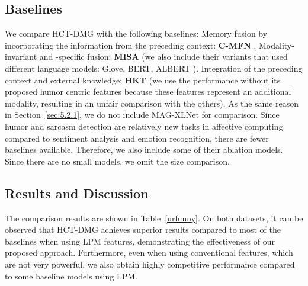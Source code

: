 \documentclass[11pt,a4paper]{article}
\begin{document}
\subsection{Baselines}
We compare HCT-DMG with the following baselines: Memory fusion by incorporating the information from the preceding context: \textbf{C-MFN} \citep{hasan2019ur}. Modality-invariant and -specific fusion: \textbf{MISA} \citep{hazarika2020misa} (we also include their variants that used different language models: Glove, BERT, ALBERT \cite{lan2019albert}). Integration of the preceding context and external knowledge: \textbf{HKT} \citep{hasan2021humor} (we use the performance without its proposed humor centric features because these features represent an additional modality, resulting in an unfair comparison with the others). As the same reason in Section~\ref{sec:5.2.1}, we do not include MAG-XLNet for comparison. Since humor and sarcasm detection are relatively new tasks in affective computing compared to sentiment analysis and emotion recognition, there are fewer baselines available. Therefore, we also include some of their ablation models. Since there are no small models, we omit the size comparison.

\subsection{Results and Discussion}

The comparison results are shown in Table~\ref{urfunny}. On both datasets, it can be observed that HCT-DMG achieves superior results compared to most of the baselines when using LPM features, demonstrating the effectiveness of our proposed approach. Furthermore, even when using conventional features, which are not very powerful, we also obtain highly competitive performance compared to some baseline models using LPM.
\end{document}
